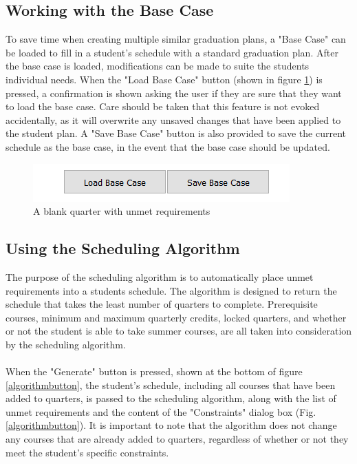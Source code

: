 \documentclass[]{article}
\begin{document}
	\subsection{Working with the Base Case}\label{ssec:9}
		To save time when creating multiple similar graduation plans, a "Base Case" can be loaded to fill in a student's schedule with a standard graduation plan. After the base case is loaded, modifications can be made to suite the students individual needs. When the "Load Base Case" button (shown in figure \ref{basecasebutton}) is pressed, a confirmation is shown asking the user if they are sure that they want to load the base case. Care should be taken that this feature is not evoked accidentally, as it will overwrite any unsaved changes that have been applied to the student plan. A "Save Base Case" button is also provided to save the current schedule as the base case, in the event that the base case should be updated. 
		\begin{figure}[H]
			\caption{A blank quarter with unmet requirements}
			\label{basecasebutton}
			\centering
			\includegraphics{basecasebutton.PNG}
		\end{figure}
	\subsection{Using the Scheduling Algorithm}\label{ssec:10}
		The purpose of the scheduling algorithm is to automatically place unmet requirements into a students schedule. The algorithm is designed to return the schedule that takes the least number of quarters to complete. Prerequisite courses, minimum and maximum quarterly credits, locked quarters, and whether or not the student is able to take summer courses, are all taken into consideration by the scheduling algorithm. \\~\\
		
		When the "Generate" button is pressed, shown at the bottom of figure \ref{algorithmbutton}, the student's schedule, including all courses that have been added to quarters, is passed to the scheduling algorithm, along with the list of unmet requirements and the content of the "Constraints" dialog box (Fig. \ref{algorithmbutton}). It is important to note that the algorithm does not change any courses that are already added to quarters, regardless of whether or not they meet the student's specific constraints.\\~\\
		
\end{document}
